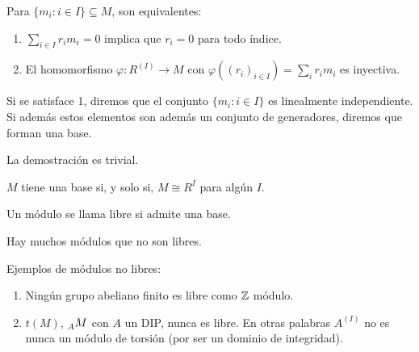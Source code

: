 \begin{lema}
  Para \(\{m_i:i\in I\}\subseteq M\), son equivalentes:
  \begin{enumerate}
    \item \(\sum_{i\in I} r_i m_i=0\) implica que \(r_i=0\) para todo índice.
    \item El homomorfismo \(\varphi:R^{(I)}\longrightarrow M\) con
      \(\varphi({(r_i)}_{i\in I})=\sum_i r_i m_i\) es inyectiva.
  \end{enumerate}
  Si se satisface 1, diremos que el conjunto \(\{m_i:i\in I\}\) es linealmente
  independiente. Si además estos elementos son además un conjunto de
  generadores, diremos que forman una base.
\end{lema}

La demostración es trivial.

\begin{obs}
  \(M\) tiene una base si, y solo si, \(M\cong R^I\) para algún \(I\).
\end{obs}

\begin{df}
  Un módulo se llama libre si admite una base.
\end{df}

\begin{obs}
  Hay muchos módulos que no son libres.
\end{obs}

Ejemplos de módulos no libres:
\begin{enumerate}
  \item Ningún grupo abeliano finito es libre como \(\mathbb{Z}\) módulo.
  \item \(t(M)\), \(\prescript{}{A}{M}\) con \(A\) un DIP, nunca es libre.
    En otras palabras \(A^{(I)}\) no es nunca un módulo de torsión (por
    ser un dominio de integridad).
\end{enumerate}

